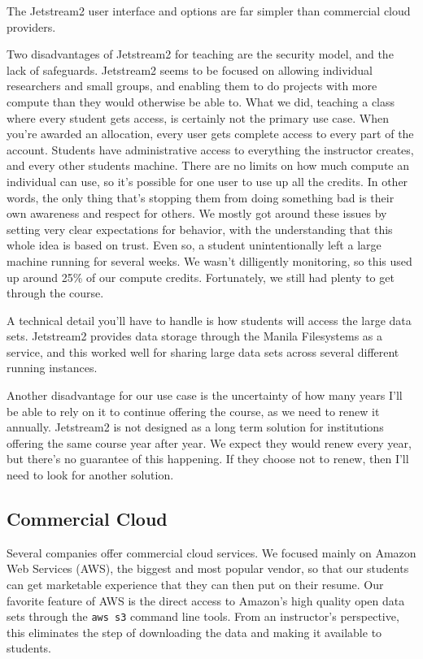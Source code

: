 \documentclass[12pt]{article}
\begin{document}
The Jetstream2 user interface and options are far simpler than commercial cloud providers.

Two disadvantages of Jetstream2 for teaching are the security model, and the lack of safeguards.
Jetstream2 seems to be focused on allowing individual researchers and small groups, and enabling them to do projects with more compute than they would otherwise be able to.
What we did, teaching a class where every student gets access, is certainly not the primary use case.
When you're awarded an allocation, every user gets complete access to every part of the account.
Students have administrative access to everything the instructor creates, and every other students machine.
There are no limits on how much compute an individual can use, so it's possible for one user to use up all the credits.
In other words, the only thing that's stopping them from doing something bad is their own awareness and respect for others.
We mostly got around these issues by setting very clear expectations for behavior, with the understanding that this whole idea is based on trust.
Even so, a student unintentionally left a large machine running for several weeks.
We wasn't dilligently monitoring, so this used up around 25\% of our compute credits.
Fortunately, we still had plenty to get through the course.

A technical detail you'll have to handle is how students will access the large data sets.
Jetstream2 provides data storage through the Manila Filesystems as a service, and this worked well for sharing large data sets across several different running instances.

Another disadvantage for our use case is the uncertainty of how many years I'll be able to rely on it to continue offering the course, as we need to renew it annually.
Jetstream2 is not designed as a long term solution for institutions offering the same course year after year. 
We expect they would renew every year, but there's no guarantee of this happening.
If they choose not to renew, then I'll need to look for another solution.

\subsection{Commercial Cloud}

Several companies offer commercial cloud services.
We focused mainly on Amazon Web Services (AWS), the biggest and most popular vendor, so that our students can get marketable experience that they can then put on their resume.
Our favorite feature of AWS is the direct access to Amazon's high quality open data sets through the \texttt{aws s3} command line tools.
From an instructor's perspective, this eliminates the step of downloading the data and making it available to students.
\end{document}
